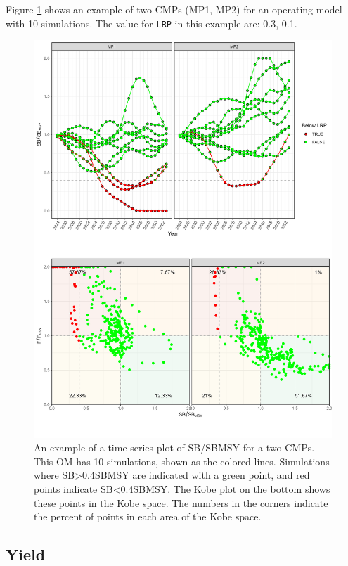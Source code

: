 \documentclass[
]{article}
\begin{document}
Figure \ref{fig:LRP} shows an example of two CMPs (MP1, MP2) for an operating model with 10 simulations. The value for \texttt{LRP} in this example are: 0.3, 0.1.

\begin{figure}
\includegraphics[width=37.5in]{../../img/PMs/LRP} \caption{An example of a time-series plot of SB/SBMSY for a two CMPs. This OM has 10 simulations, shown as the colored lines. Simulations where SB>0.4SBMSY are indicated with a green point, and red points indicate SB<0.4SBMSY. The Kobe plot on the bottom shows these points in the Kobe space. The numbers in the corners indicate the percent of points in each area of the Kobe space.}\label{fig:LRP}
\end{figure}

\hypertarget{yield}{%
\subsection{Yield}\label{yield}}
\end{document}
